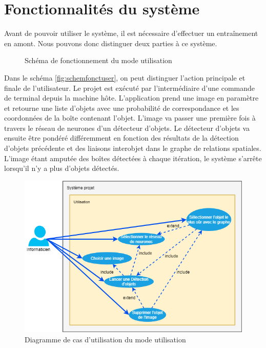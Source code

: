 \documentclass[debug,nodate,hideweeklyreports]{polytech/polytech}
\begin{document}
\section{Fonctionnalités du système}

Avant de pouvoir utiliser le système, il est nécessaire d’effectuer un entraînement en amont. Nous pouvons donc distinguer deux parties à ce système.
\begin{figure}[H]
  \caption{Schéma de fonctionnement du mode utilisation}
  \label{fig:schemfonctuser}
\end{figure}

Dans le schéma \autoref{fig:schemfonctuser}, on peut distinguer l’action principale et finale de l’utilisateur. 
Le projet est exécuté par l’intermédiaire d’une commande de terminal depuis la machine hôte. L’application prend une image en paramètre et retourne une liste d’objets avec une probabilité de correspondance et les coordonnées de la boîte contenant l’objet. L’image va passer une première fois à travers le réseau de neurones d’un détecteur d’objets. Le détecteur d’objets va ensuite être pondéré différemment en fonction des résultats de la détection d’objets précédente et des liaisons interobjet dans le graphe de relations spatiales.  L’image étant amputée des boîtes détectées à chaque itération, le système s’arrête lorsqu’il n’y a plus d’objets détectés. 

\begin{figure}[H]
  \includegraphics[width=16cm]{images/C_fonctsys2userusecase.png}
  \caption{Diagramme de cas d'utilisation du mode utilisation}
  \label{fig:usecaseuser}
\end{figure}
\end{document}
